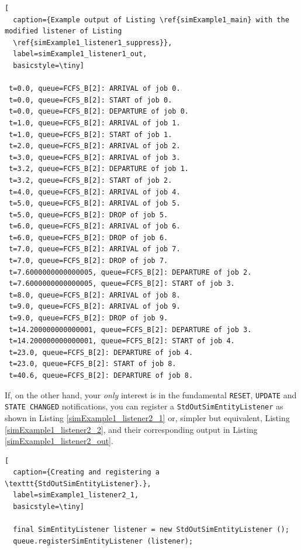 \documentclass[12pt]{book}
\begin{document}
\begin{lstfloat}
\begin{lstlisting}[
  caption={Example output of Listing \ref{simExample1_main} with the modified listener of Listing
  \ref{simExample1_listener1_suppress}},
  label=simExample1_listener1_out,
  basicstyle=\tiny]

 t=0.0, queue=FCFS_B[2]: ARRIVAL of job 0.
 t=0.0, queue=FCFS_B[2]: START of job 0.
 t=0.0, queue=FCFS_B[2]: DEPARTURE of job 0.
 t=1.0, queue=FCFS_B[2]: ARRIVAL of job 1.
 t=1.0, queue=FCFS_B[2]: START of job 1.
 t=2.0, queue=FCFS_B[2]: ARRIVAL of job 2.
 t=3.0, queue=FCFS_B[2]: ARRIVAL of job 3.
 t=3.2, queue=FCFS_B[2]: DEPARTURE of job 1.
 t=3.2, queue=FCFS_B[2]: START of job 2.
 t=4.0, queue=FCFS_B[2]: ARRIVAL of job 4.
 t=5.0, queue=FCFS_B[2]: ARRIVAL of job 5.
 t=5.0, queue=FCFS_B[2]: DROP of job 5.
 t=6.0, queue=FCFS_B[2]: ARRIVAL of job 6.
 t=6.0, queue=FCFS_B[2]: DROP of job 6.
 t=7.0, queue=FCFS_B[2]: ARRIVAL of job 7.
 t=7.0, queue=FCFS_B[2]: DROP of job 7.
 t=7.6000000000000005, queue=FCFS_B[2]: DEPARTURE of job 2.
 t=7.6000000000000005, queue=FCFS_B[2]: START of job 3.
 t=8.0, queue=FCFS_B[2]: ARRIVAL of job 8.
 t=9.0, queue=FCFS_B[2]: ARRIVAL of job 9.
 t=9.0, queue=FCFS_B[2]: DROP of job 9.
 t=14.200000000000001, queue=FCFS_B[2]: DEPARTURE of job 3.
 t=14.200000000000001, queue=FCFS_B[2]: START of job 4.
 t=23.0, queue=FCFS_B[2]: DEPARTURE of job 4.
 t=23.0, queue=FCFS_B[2]: START of job 8.
 t=40.6, queue=FCFS_B[2]: DEPARTURE of job 8.

\end{lstlisting}
\end{lstfloat}

If, on the other hand, your {\em only\/} interest is in the
  fundamental \lstinline|RESET|, \lstinline|UPDATE| and \lstinline|STATE CHANGED|
  notifications,
  you can register a \lstinline|StdOutSimEntityListener|
  as shown in Listing \ref{simExample1_listener2_1}
  or, simpler but equivalent, Listing \ref{simExample1_listener2_2},
  and their corresponding output in Listing \ref{simExample1_listener2_out}.

\begin{lstfloat}
\begin{lstlisting}[
  caption={Creating and registering a \texttt{StdOutSimEntityListener}.},
  label=simExample1_listener2_1,
  basicstyle=\tiny]

  final SimEntityListener listener = new StdOutSimEntityListener ();
  queue.registerSimEntityListener (listener);

\end{lstlisting}
\end{lstfloat}
\end{document}
